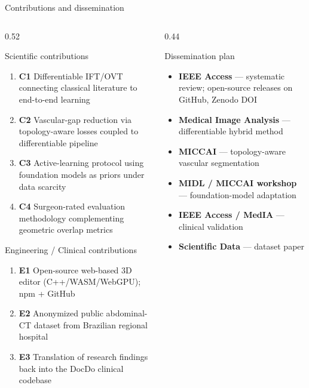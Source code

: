 \documentclass[aspectratio=169,11pt,xcolor=table]{beamer}
\begin{document}
\begin{frame}{Contributions and dissemination}
\scriptsize
\begin{columns}[T]
\begin{column}{0.52\linewidth}
\begin{block}{Scientific contributions}
\scriptsize
\begin{enumerate}
\setlength\itemsep{0pt}
\item \textbf{C1} Differentiable IFT/OVT connecting classical literature to end-to-end learning
\item \textbf{C2} Vascular-gap reduction via topology-aware losses coupled to differentiable pipeline
\item \textbf{C3} Active-learning protocol using foundation models as priors under data scarcity
\item \textbf{C4} Surgeon-rated evaluation methodology complementing geometric overlap metrics
\end{enumerate}
\end{block}
\vspace{0.05cm}
\begin{block}{Engineering / Clinical contributions}
\scriptsize
\begin{enumerate}
\setlength\itemsep{0pt}
\item \textbf{E1} Open-source web-based 3D editor (C++/WASM/WebGPU); npm + GitHub
\item \textbf{E2} Anonymized public abdominal-CT dataset from Brazilian regional hospital
\item \textbf{E3} Translation of research findings back into the DocDo clinical codebase
\end{enumerate}
\end{block}
\end{column}
\begin{column}{0.44\linewidth}
\begin{block}{Dissemination plan}
\scriptsize
\begin{itemize}
\setlength\itemsep{1pt}
\item \textbf{IEEE Access} --- systematic review; open-source releases on GitHub, Zenodo DOI
\item \textbf{Medical Image Analysis} --- differentiable hybrid method
\item \textbf{MICCAI} --- topology-aware vascular segmentation
\item \textbf{MIDL / MICCAI workshop} --- foundation-model adaptation
\item \textbf{IEEE Access / MedIA} --- clinical validation
\item \textbf{Scientific Data} --- dataset paper
\end{itemize}
\end{block}
\end{column}
\end{columns}
\end{frame}
\end{document}
